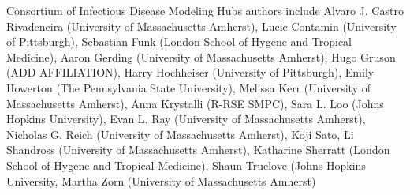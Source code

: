 \documentclass[
  article,
  shortnames,
  notitle]{jss}
\begin{document}
Consortium of Infectious Disease Modeling Hubs authors include Alvaro J.
Castro Rivadeneira (University of Massachusetts Amherst), Lucie Contamin
(University of Pittsburgh), Sebastian Funk (London School of Hygene and
Tropical Medicine), Aaron Gerding (University of Massachusetts Amherst),
Hugo Gruson (ADD AFFILIATION), Harry Hochheiser (University of
Pittsburgh), Emily Howerton (The Pennsylvania State University), Melissa
Kerr (University of Massachusetts Amherst), Anna Krystalli (R-RSE SMPC),
Sara L. Loo (Johns Hopkins University), Evan L. Ray (University of
Massachusetts Amherst), Nicholas G. Reich (University of Massachusetts
Amherst), Koji Sato, Li Shandross (University of Massachusetts Amherst),
Katharine Sherratt (London School of Hygene and Tropical Medicine),
Shaun Truelove (Johns Hopkins University, Martha Zorn (University of
Massachusetts Amherst)


\renewcommand\refname{References}
  
\end{document}
